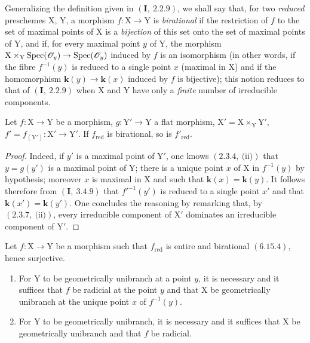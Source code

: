 \begin{env}[6.15.4]
\label{IV.6.15.4}
Generalizing the definition given in $(\mathbf{I},~2.2.9)$, we shall say that,
for two \emph{reduced} preschemes $\mathrm{X}$, $\mathrm{Y}$, a morphism $f:\mathrm{X}\to\mathrm{Y}$ is \emph{birational} if the restriction
of $f$ to the set of maximal points of $\mathrm{X}$ is a \emph{bijection} of this set onto
the set of maximal points of $\mathrm{Y}$, and if, for every maximal point $y$ of $\mathrm{Y}$, the
morphism $\mathrm{X}\times_\mathrm{Y}\operatorname{Spec}(\mathscr{O}_y)\to\operatorname{Spec}(\mathscr{O}_y)$ induced by $f$ is an isomorphism (in other words,
if the fibre $f^{-1}(y)$ is reduced to a single point $x$ (maximal in $\mathrm{X}$) and if the homomorphism
$\boldsymbol{k}(y)\to\boldsymbol{k}(x)$ induced by $f$ is bijective); this notion reduces to that of $(\mathbf{I},~2.2.9)$ when $\mathrm{X}$
and $\mathrm{Y}$ have only a \emph{finite} number of irreducible components.
\end{env}

\begin{lemma}[6.15.4.1]
\label{IV.6.15.4.1}
Let $f:\mathrm{X}\to\mathrm{Y}$ be a morphism, $g:\mathrm{Y}'\to\mathrm{Y}$ a flat morphism,
$\mathrm{X}'=\mathrm{X}\times_\mathrm{Y}\mathrm{Y}'$, $f'=f_{(\mathrm{Y}')}:\mathrm{X}'\to\mathrm{Y}'$. If $f_{\mathrm{red}}$ is birational, so is $f'_{\mathrm{red}}$.
\end{lemma}

\begin{proof}
Indeed, if $y'$ is a maximal point of $\mathrm{Y}'$, one knows $(2.3.4,~\text{(ii)})$ that $y=g(y')$ is
a maximal point of $\mathrm{Y}$; there is a unique point $x$ of $\mathrm{X}$ in $f^{-1}(y)$ by hypothesis; moreover $x$ is maximal in $\mathrm{X}$ and such that
$\boldsymbol{k}(x)=\boldsymbol{k}(y)$. It follows therefore from $(\mathbf{I},~3.4.9)$ that
$f'^{-1}(y')$ is reduced to a single point $x'$ and that $\boldsymbol{k}(x')=\boldsymbol{k}(y')$. One concludes the reasoning
by remarking that, by $(2.3.7,~\text{(ii)})$, every irreducible component of $\mathrm{X}'$ dominates
an irreducible component of $\mathrm{Y}'$.
\end{proof}

\begin{proposition}[6.15.5]
\label{IV.6.15.5}
Let $f:\mathrm{X}\to\mathrm{Y}$ be a morphism such that $f_{\mathrm{red}}$ is entire and birational
$(6.15.4)$, hence surjective.
\begin{enumerate}[label=\textup{(\roman*)}]
  \item For $\mathrm{Y}$ to be geometrically unibranch at a point $y$, it is necessary and it suffices that $f$ be
radicial at the point $y$ and that $\mathrm{X}$ be geometrically unibranch at the unique point $x$ of $f^{-1}(y)$.
  \item For $\mathrm{Y}$ to be geometrically unibranch, it is necessary and it suffices that $\mathrm{X}$ be geometrically
unibranch and that $f$ be radicial.
\end{enumerate}
\end{proposition}

